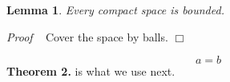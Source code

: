 \documentclass{article}
\newtheorem{lem}{Lemma}
\def\proof{ { {\noindent \it Proof} \hbox{       } } }
\begin{document}
\begin{lem} Every compact space is
bounded. \end{lem} \proof Cover the space by balls. $\Box$

\begin{equation} a = b \end{equation} {\bf Theorem 2.} is what we use next.
\end{document}
